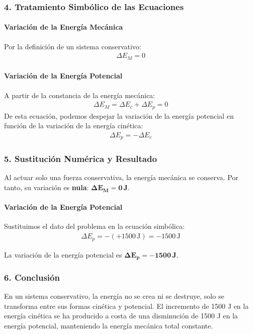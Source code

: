 \subsubsection*{4. Tratamiento Simbólico de las Ecuaciones}
\paragraph{Variación de la Energía Mecánica}
Por la definición de un sistema conservativo:
\begin{gather}
    \Delta E_M = 0
\end{gather}

\paragraph{Variación de la Energía Potencial}
A partir de la constancia de la energía mecánica:
\begin{gather}
    \Delta E_M = \Delta E_c + \Delta E_p = 0
\end{gather}
De esta ecuación, podemos despejar la variación de la energía potencial en función de la variación de la energía cinética:
\begin{gather}
    \Delta E_p = -\Delta E_c
\end{gather}

\subsubsection*{5. Sustitución Numérica y Resultado}
\begin{cajaresultado}
Al actuar solo una fuerza conservativa, la energía mecánica se conserva. Por tanto, su variación es \textbf{nula}: $\boldsymbol{\Delta E_M = 0\,\textbf{J}}$.
\end{cajaresultado}

\paragraph{Variación de la Energía Potencial}
Sustituimos el dato del problema en la ecuación simbólica:
\begin{gather}
    \Delta E_p = -(+1500\,\text{J}) = -1500\,\text{J}
\end{gather}
\begin{cajaresultado}
La variación de la energía potencial es $\boldsymbol{\Delta E_p = -1500\,\textbf{J}}$.
\end{cajaresultado}

\subsubsection*{6. Conclusión}
\begin{cajaconclusion}
En un sistema conservativo, la energía no se crea ni se destruye, solo se transforma entre sus formas cinética y potencial. El incremento de 1500 J en la energía cinética se ha producido a costa de una disminución de 1500 J en la energía potencial, manteniendo la energía mecánica total constante.
\end{cajaconclusion}

